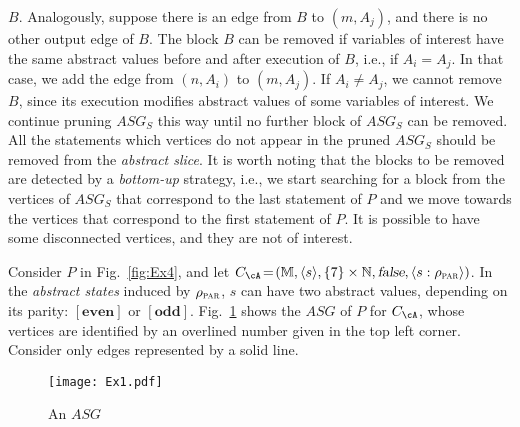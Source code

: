 \documentclass[prodmode,acmtocl]{acmsmall}
\def\prog{\ensuremath{P}\xspace}
\def\memories{\ensuremath{\mathbb{M}}\xspace}
\def\crit{\ensuremath{C}\xspace}
\def\uco{\ensuremath{\rho}\xspace}
\def\ASG{\ensuremath{\mathit{ASG}}\xspace}
\newcommand{\COMMENT} [1]{}
\newcommand{\false}{\mbox{\sl false}}
\def\tuple#1{\langle #1 \rangle}
\newcommand{\0}{\mbox{\bf 0}}
\def\NATURALS{\mathbb{N}}
\def\PARDOM{\ensuremath{\uco_{\textsc{par}}}\xspace}
\def\EVEN{\ABSVAL{even}}
\def\ODD{\ABSVAL{odd}}
\newcommand{\ABSVAL}[1]{\left[\mathbf{#1}\right]}
\begin{document}
{{  $B$. Analogously, suppose there is an edge from $B$ to $(m, A_j)$,
  and there is no other output edge of $B$. The block $B$ can be
  removed if variables of interest have the same abstract values
  before and after execution of $B$, i.e., if $A_i\!=\!A_j$. In that
  case, we add the edge from $(n, A_i)$ to $(m, A_j)$. If
  $A_i\!\neq\!A_j$, we cannot remove $B$, since its execution modifies
  abstract values of some variables of interest. We continue pruning
  $ASG_S$ this way until no further block of $ASG_S$ can be
  removed. All the statements which vertices do not appear in the
  pruned $ASG_S$ should be removed from the \emph{abstract slice}. It
  is worth noting that the blocks to be removed are detected by a
  \emph{bottom-up} strategy, i.e., we start searching for a block from
  the vertices of $ASG_S$ that correspond to the last statement of $P$
  and we move towards the vertices that correspond to the first
  statement of $P$. It is possible to have some disconnected vertices,
  and they are not of interest.\\}

\begin{example}
  \label{example:4}
  Consider $\prog$ in Fig.~\ref{fig:Ex4}, and let
  $\crit_{\cA}\!=\!(\memories, \tuple{s}, \{7\}\times\NATURALS,
  \false, \tuple{s:\PARDOM})$.  In the \emph{abstract states} induced
  by $\PARDOM$, $s$ can have two abstract values, depending on its
  parity: $\EVEN$ or $\ODD$.  Fig.~\ref{fig:Ex1} shows the $\ASG$ of
  $\prog$ for $\crit_\cA$, whose vertices are identified by an
  overlined number given in the top left corner. Consider only edges
  represented by a solid line.
  \begin{figure}[ht]
    \centering
    \texttt{[image: Ex1.pdf]}
    \caption{An $\ASG$\label{fig:Ex1}}
  \end{figure}
  \COMMENT{A concrete value of $s$ is modified by the statement $5$ in
    every iteration, but it is obvious that this modification does not
    affect the parity of $s$, since its concrete value increases of
    $2i$. Because of that fact, there is no edge from
    $\tt{\overline{7}}$ to $\tt{\overline{10}}$, and from
    $\tt{\overline{8}}$ to $\tt{\overline{9}}$.}


\end{example}}
\end{document}
